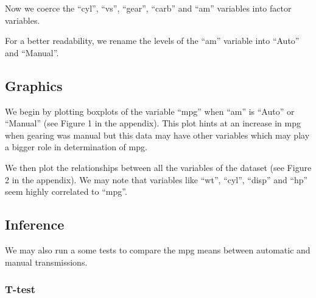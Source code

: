 \documentclass[a3paper]{article}
\newenvironment{Shaded}{\begin{snugshade}}{\end{snugshade}}
\newcommand{\KeywordTok}[1]{\textcolor[rgb]{0.13,0.29,0.53}{\textbf{{#1}}}}
\newcommand{\StringTok}[1]{\textcolor[rgb]{0.31,0.60,0.02}{{#1}}}
\newcommand{\NormalTok}[1]{{#1}}
\begin{document}
Now we coerce the ``cyl'', ``vs'', ``gear'', ``carb'' and ``am''
variables into factor variables.

\begin{Shaded}
\end{Shaded}

For a better readability, we rename the levels of the ``am'' variable
into ``Auto'' and ``Manual''.

\begin{Shaded}
\end{Shaded}

\subsection{Graphics}\label{graphics}

We begin by plotting boxplots of the variable ``mpg'' when ``am'' is
``Auto'' or ``Manual'' (see Figure 1 in the appendix). This plot hints
at an increase in mpg when gearing was manual but this data may have
other variables which may play a bigger role in determination of mpg.

We then plot the relationships between all the variables of the dataset
(see Figure 2 in the appendix). We may note that variables like ``wt'',
``cyl'', ``disp'' and ``hp'' seem highly correlated to ``mpg''.

\subsection{Inference}\label{inference}

We may also run a some tests to compare the mpg means between automatic
and manual transmissions.

\subsubsection{T-test}\label{t-test}
\end{document}
